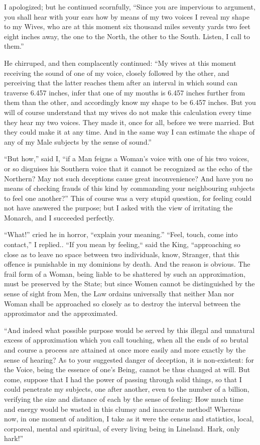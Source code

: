 \documentclass[12pt, a4paper, oneside]{memoir}
\begin{document}
I apologized; but he continued scornfully, ``Since you are impervious to
argument, you shall hear with your ears how by means of my two voices I reveal
my shape to my Wives, who are at this moment six thousand miles seventy yards
two feet eight inches away, the one to the North, the other to the South.
Listen, I call to them.''

He chirruped, and then complacently continued: ``My wives at this moment
receiving the sound of one of my voice, closely followed by the other, and
perceiving that the latter reaches them after an interval in which sound can
traverse 6.457 inches, infer that one of my mouths is 6.457 inches further
from them than the other, and accordingly know my shape to be 6.457 inches.
But you will of course understand that my wives do not make this calculation
every time they hear my two voices. They made it, once for all, before we were
married. But they could make it at any time. And in the same way I can
estimate the shape of any of my Male subjects by the sense of sound.''

``But how,'' said I, ``if a Man feigns a Woman's voice with one of his two
voices, or so disguises his Southern voice that it cannot be recognized as the
echo of the Northern? May not such deceptions cause great inconvenience? And
have you no means of checking frauds of this kind by commanding your
neighbouring subjects to feel one another?'' This of course was a very stupid
question, for feeling could not have answered the purpose; but I asked with
the view of irritating the Monarch, and I succeeded perfectly.

``What!'' cried he in horror, ``explain your meaning.'' ``Feel, touch, come into
contact,'' I replied.. ``If you mean by feeling,`` said the King, ``approaching so
close as to leave no space between two individuals, know, Stranger, that this
offence is punishable in my dominions by death. And the reason is obvious. The
frail form of a Woman, being liable to be shattered by such an approximation,
must be preserved by the State; but since Women cannot be distinguished by the
sense of sight from Men, the Law ordains universally that neither Man nor
Woman shall be approached so closely as to destroy the interval between the
approximator and the approximated.

``And indeed what possible purpose would be served by this illegal and
unnatural excess of approximation which you call touching, when all the ends
of so brutal and course a process are attained at once more easily and more
exactly by the sense of hearing? As to your suggested danger of deception, it
is non-existent: for the Voice, being the essence of one's Being, cannot be
thus changed at will. But come, suppose that I had the power of passing
through solid things, so that I could penetrate my subjects, one after
another, even to the number of a billion, verifying the size and distance of
each by the sense of feeling: How much time and energy would be wasted in this
clumsy and inaccurate method! Whereas now, in one moment of audition, I take
as it were the census and statistics, local, corporeal, mental and spiritual,
of every living being in Lineland. Hark, only hark!''
\end{document}
